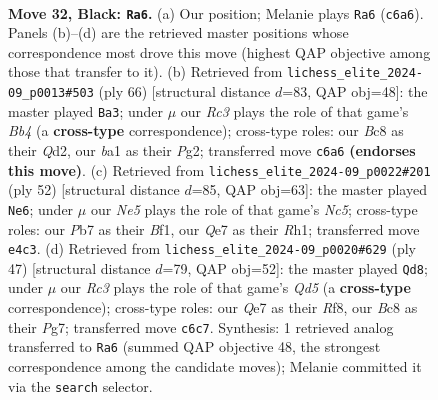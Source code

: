 \documentclass[11pt]{article}
\begin{document}
\clearpage

\begin{figure}[p]\centering
\begin{subfigure}{0.46\textwidth}\centering
\resizebox{\linewidth}{!}{%
\newchessgame
\chessboard[
  setfen={1rb2k2/1p2q2p/2r5/1R1Q2p1/N3n3/4P1P1/P4PKP/B3R3 b - - 0 32},
  showmover=false,
  pgfstyle=straightmove, color=movearrow, markmove={c6-a6}
]}
\caption{}
\end{subfigure}\hfill
\begin{subfigure}{0.46\textwidth}\centering
\resizebox{\linewidth}{!}{%
\newchessgame
\chessboard[
  setfen={1r4k1/4b1p1/1qrp3p/4p3/RBP2p2/5P2/1P1Q2PP/2R4K w - - 1 34},
  showmover=false,
  pgfstyle=straightmove, color=movearrow, markmove={b4-a3}
]}
\caption{}
\end{subfigure}
\\[4pt]
\begin{subfigure}{0.46\textwidth}\centering
\resizebox{\linewidth}{!}{%
\newchessgame
\chessboard[
  setfen={3r2k1/6pp/1b1q1p2/2Np4/1P2pPQP/4B3/6PK/r4B1R w - - 0 27},
  showmover=false,
  pgfstyle=straightmove, color=movearrow, markmove={c5-e6}
]}
\caption{}
\end{subfigure}\hfill
\begin{subfigure}{0.46\textwidth}\centering
\resizebox{\linewidth}{!}{%
\newchessgame
\chessboard[
  setfen={5r1k/p4ppp/5n2/8/2rq4/QN1p2P1/P4P1P/3RR1K1 b - - 1 24},
  showmover=false,
  pgfstyle=straightmove, color=movearrow, markmove={d4-d8}
]}
\caption{}
\end{subfigure}
\caption{\textbf{Move 32, Black: \texttt{Ra6}.} (a) Our position; Melanie plays \texttt{Ra6} (\texttt{c6a6}). Panels (b)--(d) are the retrieved master positions whose correspondence most drove this move (highest QAP objective among those that transfer to it). (b) Retrieved from \texttt{lichess\_elite\_2024-09\_p0013\#503} (ply 66) [structural distance $d$=83, QAP obj=48]: the master played \texttt{Ba3}; under $\mu$ our \emph{Rc3} plays the role of that game's \emph{Bb4} (a \textbf{cross-type} correspondence); cross-type roles: our \emph{B}c8 as their \emph{Q}d2, our \emph{b}a1 as their \emph{P}g2; transferred move \texttt{c6a6} \textbf{(endorses this move)}. (c) Retrieved from \texttt{lichess\_elite\_2024-09\_p0022\#201} (ply 52) [structural distance $d$=85, QAP obj=63]: the master played \texttt{Ne6}; under $\mu$ our \emph{Ne5} plays the role of that game's \emph{Nc5}; cross-type roles: our \emph{P}b7 as their \emph{B}f1, our \emph{Q}e7 as their \emph{R}h1; transferred move \texttt{e4c3}. (d) Retrieved from \texttt{lichess\_elite\_2024-09\_p0020\#629} (ply 47) [structural distance $d$=79, QAP obj=52]: the master played \texttt{Qd8}; under $\mu$ our \emph{Rc3} plays the role of that game's \emph{Qd5} (a \textbf{cross-type} correspondence); cross-type roles: our \emph{Q}e7 as their \emph{R}f8, our \emph{B}c8 as their \emph{P}g7; transferred move \texttt{c6c7}. Synthesis: 1 retrieved analog transferred to \texttt{Ra6} (summed QAP objective 48, the strongest correspondence among the candidate moves); Melanie committed it via the \texttt{search} selector.}
\label{fig:thought-m63}
\end{figure}
\end{document}
